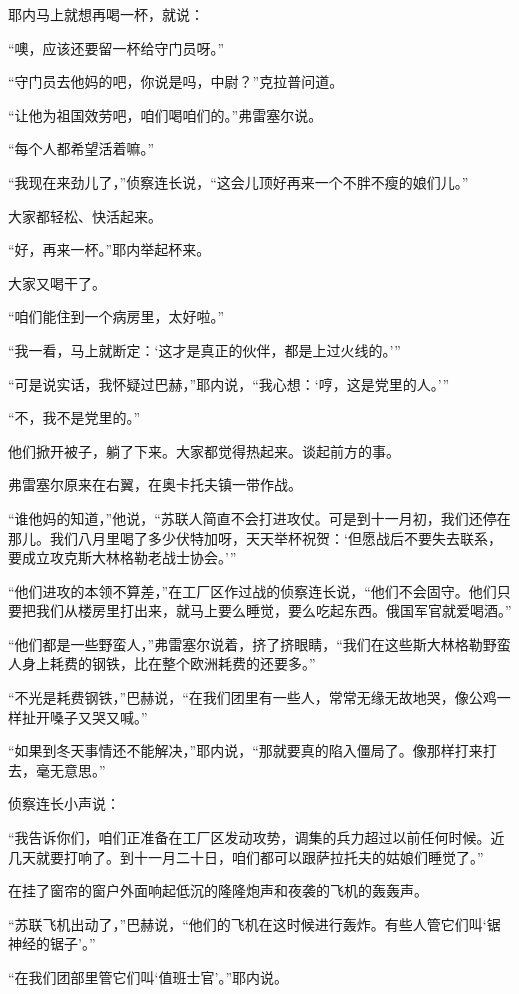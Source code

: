 耶内马上就想再喝一杯，就说：

“噢，应该还要留一杯给守门员呀。”

“守门员去他妈的吧，你说是吗，中尉？”克拉普问道。

“让他为祖国效劳吧，咱们喝咱们的。”弗雷塞尔说。

“每个人都希望活着嘛。”

“我现在来劲儿了，”侦察连长说，“这会儿顶好再来一个不胖不瘦的娘们儿。”

大家都轻松、快活起来。

“好，再来一杯。”耶内举起杯来。

大家又喝干了。

“咱们能住到一个病房里，太好啦。”

“我一看，马上就断定：‘这才是真正的伙伴，都是上过火线的。’”

“可是说实话，我怀疑过巴赫，”耶内说，“我心想：‘哼，这是党里的人。’”

“不，我不是党里的。”

他们掀开被子，躺了下来。大家都觉得热起来。谈起前方的事。

弗雷塞尔原来在右翼，在奥卡托夫镇一带作战。

“谁他妈的知道，”他说，“苏联人简直不会打进攻仗。可是到十一月初，我们还停在那儿。我们八月里喝了多少伏特加呀，天天举杯祝贺：‘但愿战后不要失去联系，要成立攻克斯大林格勒老战士协会。’”

“他们进攻的本领不算差，”在工厂区作过战的侦察连长说，“他们不会固守。他们只要把我们从楼房里打出来，就马上要么睡觉，要么吃起东西。俄国军官就爱喝酒。”

“他们都是一些野蛮人，”弗雷塞尔说着，挤了挤眼睛，“我们在这些斯大林格勒野蛮人身上耗费的钢铁，比在整个欧洲耗费的还要多。”

“不光是耗费钢铁，”巴赫说，“在我们团里有一些人，常常无缘无故地哭，像公鸡一样扯开嗓子又哭又喊。”

“如果到冬天事情还不能解决，”耶内说，“那就要真的陷入僵局了。像那样打来打去，毫无意思。”

侦察连长小声说：

“我告诉你们，咱们正准备在工厂区发动攻势，调集的兵力超过以前任何时候。近几天就要打响了。到十一月二十日，咱们都可以跟萨拉托夫的姑娘们睡觉了。”

在挂了窗帘的窗户外面响起低沉的隆隆炮声和夜袭的飞机的轰轰声。

“苏联飞机出动了，”巴赫说，“他们的飞机在这时候进行轰炸。有些人管它们叫‘锯神经的锯子’。”

“在我们团部里管它们叫‘值班士官’。”耶内说。

